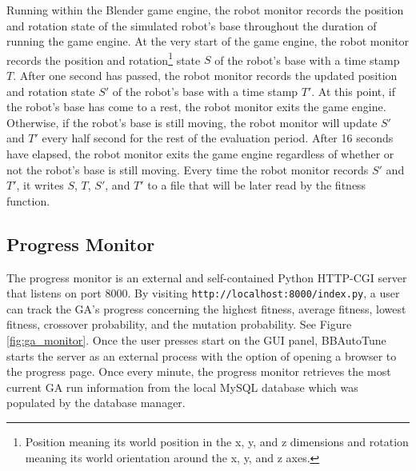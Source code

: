 Running within the Blender game engine, the robot monitor records the position and rotation state of the simulated robot's base throughout the duration of running the game engine. At the very start of the game engine, the robot monitor records the position and rotation\footnote{Position meaning its world position in the x, y, and z dimensions and rotation meaning its world orientation around the x, y, and z axes.} state $S$ of the robot's base with a time stamp $T$. After one second has passed, the robot monitor records the updated position and rotation state $S'$ of the robot's base with a time stamp $T'$. At this point, if the robot's base has come to a rest, the robot monitor exits the game engine. Otherwise, if the robot's base is still moving, the robot monitor will update $S'$ and $T'$ every half second for the rest of the evaluation period. After 16 seconds have elapsed, the robot monitor exits the game engine regardless of whether or not the robot's base is still moving. Every time the robot monitor records $S'$ and $T'$, it writes $S$, $T$, $S'$, and $T'$ to a file that will be later read by the fitness function.  

\subsection{Progress Monitor}

The progress monitor is an external and self-contained Python HTTP-CGI server that listens on port 8000. By visiting  \texttt{http://localhost:8000/index.py}, a user can track the GA's progress concerning the highest fitness, average fitness, lowest fitness, crossover probability, and the mutation probability. See Figure \ref{fig:ga_monitor}. Once the user presses start on the GUI panel, BBAutoTune starts the server as an external process with the option of opening a browser to the progress page. Once every minute, the progress monitor retrieves the most current GA run information from the local MySQL database which was populated by the database manager.


